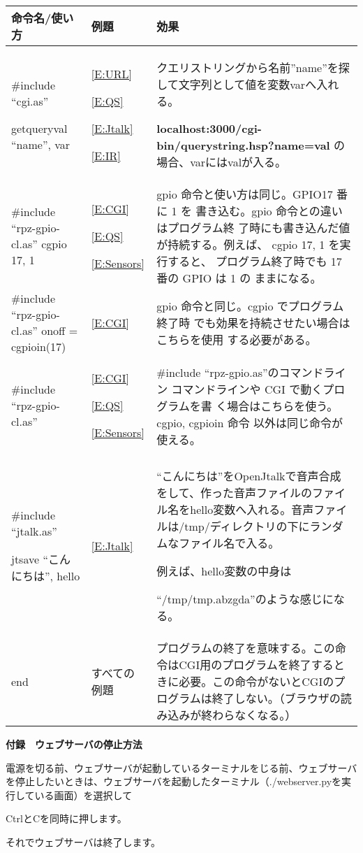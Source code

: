 \begin{flushleft}
	\tablefirsthead{}
	\tablehead{}
	\tabletail{}
	\tablelasttail{}
	\begin{supertabular}{|m{5.467cm}|m{3.181cm}|m{7.7cm}|}
		\hline
		命令名/使い方 & 例題 & 効果\\\hline
		\#include “cgi.as”

		getqueryval “name”, var &
		\ref*{E:URL}

		\ref*{E:QS}

		\ref*{E:Jtalk}

		\ref*{E:IR} &
		クエリストリングから名前”name”を探して文字列として値を変数varへ入れる。

		\textbf{localhost:3000/cgi-bin/querystring.hsp?name=val} の場合、varにはvalが入る。\\\hline

		\#include “rpz-gpio-cl.as”
		cgpio 17, 1&
		\ref*{E:CGI}

		\ref*{E:QS}

		\ref*{E:Sensors} &
		gpio 命令と使い方は同じ。GPIO17 番に 1 を
		書き込む。gpio 命令との違いはプログラム終
		了時にも書き込んだ値が持続する。例えば、
		cgpio 17, 1 を実行すると、
		プログラム終了時でも 17 番の GPIO は 1 の
		ままになる。\\\hline

		\#include “rpz-gpio-cl.as”
		onoff = cgpioin(17)&
		\ref*{E:CGI} &
		gpio 命令と同じ。cgpio でプログラム終了時
		でも効果を持続させたい場合はこちらを使用
		する必要がある。\\\hline

		\#include “rpz-gpio-cl.as”&
		\ref*{E:CGI}

		\ref*{E:QS}

		\ref*{E:Sensors} &
		\#include “rpz-gpio.as”のコマンドライン
		コマンドラインや CGI で動くプログラムを書
		く場合はこちらを使う。cgpio, cgpioin 命令
		以外は同じ命令が使える。\\\hline

		\#include “jtalk.as”

		jtsave “こんにちは”, hello &
		\ref*{E:Jtalk} &
		“こんにちは”をOpenJtalkで音声合成をして、作った音声ファイルのファイル名をhello変数へ入れる。音声ファイルは/tmp/ディレクトリの下にランダムなファイル名で入る。

		例えば、hello変数の中身は

		“/tmp/tmp.abzgda”のような感じになる。 \\\hline
		end &
		すべての例題 &
		プログラムの終了を意味する。この命令はCGI用のプログラムを終了するときに必要。この命令がないとCGIのプログラムは終了しない。（ブラウザの読み込みが終わらなくなる。）\\\hline
	\end{supertabular}
\end{flushleft}

\bigskip

{\bfseries 付録　ウェブサーバの停止方法}

電源を切る前、ウェブサーバが起動しているターミナルをじる前、ウェブサーバを停止したいときは、ウェブサーバを起動したターミナル（./webserver.pyを実行している画面）を選択して

CtrlとCを同時に押します。

それでウェブサーバは終了します。
